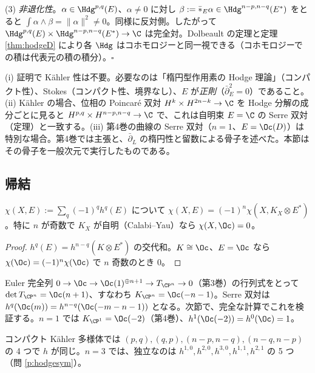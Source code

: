 (3) \emph{非退化性}。$\alpha\in\Hdg^{p,q}(E)$、$\alpha\neq0$ に対し $\beta:=\bar\ast_E\alpha\in\Hdg^{n-p,n-q}(E^*)$ をとると $\int\alpha\wedge\beta=\|\alpha\|^2\ne0$。同様に反対側。したがって $\Hdg^{p,q}(E)\times\Hdg^{n-p,n-q}(E^*)\to\C$ は完全対。Dolbeault の定理と定理 \ref{thm:hodgeD} により各 $\Hdg$ はコホモロジーと同一視できる（コホモロジーでの積は代表元の積の積分）。\hfill$\square$

\begin{rem}
(i) 証明で Kähler 性は不要。必要なのは「楕円型作用素の Hodge 理論」（コンパクト性）、Stokes（コンパクト性、境界なし）、$E$ が\emph{正則}（$\bar\partial_E^2=0$）であること。(ii) Kähler の場合、位相の Poincaré 双対 $H^k\times H^{2n-k}\to\C$ を Hodge 分解の成分ごとに見ると $H^{p,q}\times H^{n-p,n-q}\to\C$ で、これは自明束 $E=\C$ の Serre 双対（定理）と一致する。(iii) 第4巻の曲線の Serre 双対（$n=1$、$E=\Oc(D)$）は特別な場合。第4巻では主張と、$\bar\partial_L$ の楕円性と留数による骨子を述べた。本節はその骨子を一般次元で実行したものである。
\end{rem}

\subsection{帰結}
\begin{cor}\label{cor:chidual}\tP
$\chi(X,E):=\sum_q(-1)^qh^q(E)$ について $\chi(X,E)=(-1)^n\chi(X,K_X\otimes E^*)$。特に $n$ が奇数で $K_X$ が自明（Calabi--Yau）なら $\chi(X,\Oc)=0$。
\end{cor}
\begin{proof}
$h^q(E)=h^{n-q}(K\otimes E^*)$ の交代和。$K\cong\Oc$、$E=\Oc$ なら $\chi(\Oc)=(-1)^n\chi(\Oc)$ で $n$ 奇数のとき $0$。
\end{proof}
\begin{ex}[射影空間：$K_{\CP^n}=\Oc(-n-1)$]\label{ex:KPn}
Euler 完全列 $0\to\Oc\to\Oc(1)^{\oplus n+1}\to T_{\CP^n}\to0$（第3巻）の行列式をとって $\det T_{\CP^n}=\Oc(n+1)$、すなわち $K_{\CP^n}=\Oc(-n-1)$。Serre 双対は $h^q(\Oc(m))=h^{n-q}(\Oc(-m-n-1))$ となる。次節で、完全な計算でこれを検証する。$n=1$ では $K_{\CP^1}=\Oc(-2)$（第4巻）、$h^1(\Oc(-2))=h^0(\Oc)=1$。
\end{ex}
\begin{ex}
コンパクト Kähler 多様体では $(p,q),(q,p),(n-p,n-q),(n-q,n-p)$ の 4 つで $h$ が同じ。$n=3$ では、独立なのは $h^{1,0},h^{2,0},h^{3,0},h^{1,1},h^{2,1}$ の 5 つ（問 \ref{p:hodgesym}）。
\end{ex}

